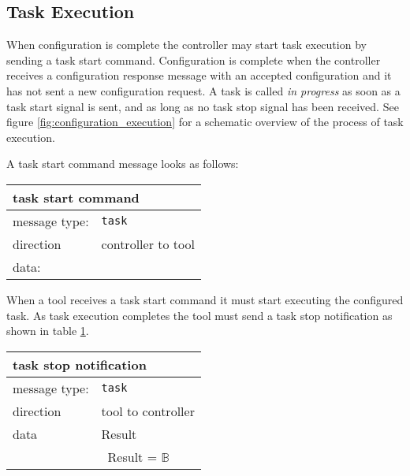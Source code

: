 \documentclass{article}
\newcommand{\msg}[1]{\texttt{#1}}
\begin{document}
  \subsection{Task Execution} \label{ss::task_execution}

   When configuration is complete the controller may start task execution by
   sending a task start command. Configuration is complete when the controller
   receives a configuration response message with an accepted configuration and
   it has not sent a new configuration request.  A task is called \textit{in
   progress} as soon as a task start signal is sent, and as long as no task
   stop signal has been received. See figure \ref{fig:configuration_execution}
   for a schematic overview of the process of task execution.

   A task start command message looks as follows:

   \begin{table}[H]
    \begin{center}
     \begin{tabular}{|ll|}
      \hline
       \multicolumn{2}{|l|}{\textbf{task start command}} \\
      \hline
       message type:   & \msg{task} \\
      \hline
       direction       & controller to tool \\
       data:           & \\
      \hline
     \end{tabular}
    \end{center}
    \vspace{-0.3cm}
   \end{table}

   \noindent When a tool receives a task start command it must start executing
   the configured task. As task execution completes the tool must send a task stop
   notification as shown in table \ref{table:task_stop}.

   \begin{table}[H]
    \begin{center}
     \begin{tabular}{|ll|}
      \hline
       \multicolumn{2}{|l|}{\textbf{task stop notification}} \\
      \hline
       message type:   & \msg{task} \\
      \hline
       direction       & tool to controller \\
       data            & Result \\
                       & \ Result = $\mathbb{B}$ \\
      \hline
     \end{tabular}
     \label{table:task_stop}
    \end{center}
    \vspace{-0.3cm}
   \end{table}
\end{document}
